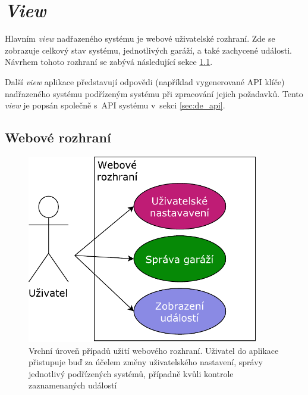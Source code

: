 \section{\textit{View}}

Hlavním \textit{view} nadřazeného systému je webové uživatelské rozhraní. Zde se zobrazuje celkový stav systému, jednotlivých garáží, a také zachycené události. Návrhem tohoto rozhraní se zabývá následující sekce \ref{sec:de_web}.

Další \textit{view} aplikace představují odpovědi (například vygenerované API klíče) nadřazeného systému podřízeným systému při zpracování jejich požadavků. Tento \textit{view} je popsán společně s~API systému v~sekci \ref{sec:de_api}.

\subsection{Webové rozhraní}
\label{sec:de_web}

\begin{figure}[h!]
    \centering
    \includegraphics[width=0.9\textwidth]{images/use_case_top.pdf}
    \caption[Vrchní úroveň případů užití webového rozhraní]{Vrchní úroveň případů užití webového rozhraní. Uživatel do aplikace přistupuje buď za účelem změny uživatelského nastavení, správy jednotlivý podřízených systémů, případně kvůli kontrole zaznamenaných událostí}
    \label{fig:use_case_top}
\end{figure}

